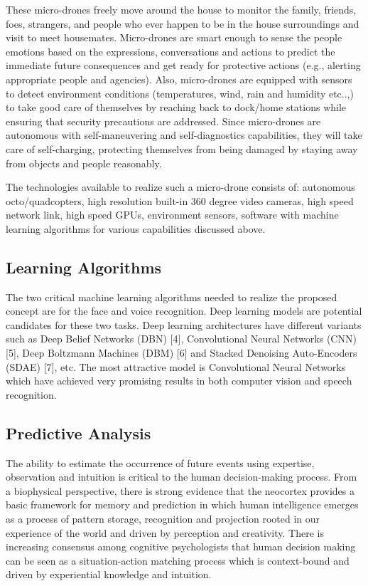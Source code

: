 \documentclass[sigconf]{acmart}
\begin{document}
These micro-drones freely move around the house to monitor the family, friends, foes, strangers, and people who ever happen to be in the house surroundings and visit to meet housemates. Micro-drones are smart enough to sense the people emotions based on the expressions, conversations and actions to predict the immediate future consequences and get ready for protective actions (e.g., alerting appropriate people and agencies). Also, micro-drones are equipped with sensors to detect environment conditions (temperatures, wind, rain and humidity etc..,) to take good care of themselves by reaching back to dock/home stations while ensuring that security precautions are addressed. 
Since micro-drones are autonomous with self-maneuvering and self-diagnostics capabilities, they will take care of self-charging, protecting themselves from being damaged by staying away from objects and people reasonably.

The technologies available to realize such a micro-drone consists of: autonomous octo/quadcopters, high resolution built-in 360 degree video cameras, high speed network link, high speed GPUs, environment sensors, software with machine learning algorithms for various capabilities discussed above.

\subsection{Learning Algorithms}
The two critical machine learning algorithms needed to realize the proposed concept are for the face and voice recognition. Deep learning models are potential candidates for these two tasks. Deep learning architectures have different variants such as Deep Belief Networks (DBN) [4], Convolutional Neural Networks (CNN) [5], Deep Boltzmann Machines (DBM) [6] and Stacked Denoising Auto-Encoders (SDAE) [7], etc. The most attractive model is Convolutional Neural Networks which have achieved very promising results in both computer vision and speech recognition.

\subsection{Predictive Analysis }
The ability to estimate the occurrence of future events using expertise, observation and intuition is critical to the human decision-making process. From a biophysical perspective, there is strong evidence that the neocortex provides a basic framework for memory and prediction in which human intelligence emerges as a process of pattern storage, recognition and projection rooted in our experience of the world and driven by perception and creativity. There is increasing consensus among cognitive psychologists that human decision making can be seen as a situation-action matching process which is context-bound and driven by experiential knowledge and intuition.
\end{document}
